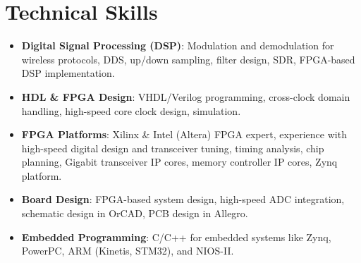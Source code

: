 \documentclass[10pt, a4paper]{article}
\begin{document}
\section{Technical Skills}

\begin{itemize}
    \item \textbf{Digital Signal Processing (DSP)}: Modulation and demodulation for wireless protocols, DDS, up/down sampling, filter design, SDR, FPGA-based DSP implementation.
    \item \textbf{HDL \& FPGA Design}: VHDL/Verilog programming, cross-clock domain handling, high-speed core clock design, simulation. 
    \item \textbf{FPGA Platforms}: Xilinx \& Intel (Altera) FPGA expert, experience with high-speed digital design and transceiver tuning, timing analysis, chip planning, Gigabit transceiver IP cores, memory controller IP cores, Zynq platform.
    \item \textbf{Board Design}: FPGA-based system design, high-speed ADC integration, schematic design in OrCAD, PCB design in Allegro.
    \item \textbf{Embedded Programming}: C/C++ for embedded systems like Zynq, PowerPC, ARM (Kinetis, STM32), and NIOS-II.
\end{itemize}
\end{document}
